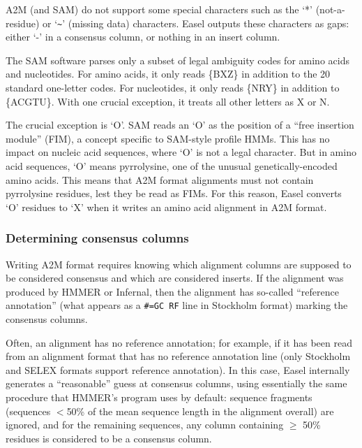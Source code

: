 A2M (and SAM) do not support some special characters such as the `*'
(not-a-residue) or `\verb+~+' (missing data) characters. Easel outputs these
characters as gaps: either `-' in a consensus column, or nothing in an
insert column.

The SAM software parses only a subset of legal ambiguity codes for
amino acids and nucleotides. For amino acids, it only reads \{BXZ\} in
addition to the 20 standard one-letter codes. For nucleotides, it only
reads \{NRY\} in addition to \{ACGTU\}. With one crucial exception, it
treats all other letters as X or N. 

The crucial exception is `O'. SAM reads an `O' as the position of a
``free insertion module'' (FIM), a concept specific to SAM-style
profile HMMs. This has no impact on nucleic acid sequences, where `O'
is not a legal character. But in amino acid sequences, `O' means
pyrrolysine, one of the unusual genetically-encoded amino acids.  This
means that A2M format alignments must not contain pyrrolysine
residues, lest they be read as FIMs. For this reason, Easel converts
`O' residues to `X' when it writes an amino acid alignment in A2M
format.

\subsubsection{Determining consensus columns}

Writing A2M format requires knowing which alignment columns are
supposed to be considered consensus and which are considered
inserts. If the alignment was produced by HMMER or Infernal, then the
alignment has so-called ``reference annotation'' (what appears as a
\verb+#=GC RF+ line in Stockholm format) marking the consensus
columns. 

Often, an alignment has no reference annotation; for example, if it
has been read from an alignment format that has no reference
annotation line (only Stockholm and SELEX formats support reference
annotation). In this case, Easel internally generates a ``reasonable''
guess at consensus columns, using essentially the same procedure that
HMMER's  program uses by default: sequence fragments
(sequences $<$50\% of the mean sequence length in the alignment
overall) are ignored, and for the remaining sequences, any column
containing $\geq$ 50\% residues is considered to be a consensus
column.










